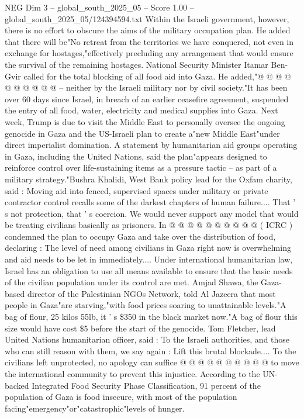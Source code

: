 \begin{textsample}{NEG Dim 3 – global\_south\_2025\_05 – Score 1.00 – global\_south\_2025\_05/124394594.txt}
Within the Israeli government, however, there is no effort to obscure the aims of the military occupation plan.
He added that there will be"No retreat from the territories we have conquered, not even in exchange for hostages,"effectively precluding any arrangement that would ensure the survival of the remaining hostages.
National Security Minister Itamar Ben-Gvir called for the total blocking of all food aid into Gaza.
He added,"@ @ @ @ @ @ @ @ @ @ -- neither by the Israeli military nor by civil society."It has been over 60 days since Israel, in breach of an earlier ceasefire agreement, suspended the entry of all food, water, electricity and medical supplies into Gaza.
Next week, Trump is due to visit the Middle East to personally oversee the ongoing genocide in Gaza and the US-Israeli plan to create a"new Middle East"under direct imperialist domination.
A statement by humanitarian aid groups operating in Gaza, including the United Nations, said the plan"appears designed to reinforce control over life-sustaining items as a pressure tactic -- as part of a military strategy."Bushra Khalidi, West Bank policy lead for the Oxfam charity, said : Moving aid into fenced, supervised spaces under military or private contractor control recalls some of the darkest chapters of human failure....
That ' s not protection, that ' s coercion.
We would never support any model that would be treating civilians basically as prisoners.
In @ @ @ @ @ @ @ @ @ @ ( ICRC ) condemned the plan to occupy Gaza and take over the distribution of food, declaring : The level of need among civilians in Gaza right now is overwhelming and aid needs to be let in immediately....
Under international humanitarian law, Israel has an obligation to use all means available to ensure that the basic needs of the civilian population under its control are met.
Amjad Shawa, the Gaza-based director of the Palestinian NGOs Network, told Al Jazeera that most people in Gaza"are starving,"with food prices soaring to unattainable levels."A bag of flour, 25 kilos 55lb, it ' s \$350 in the black market now."A bag of flour this size would have cost \$5 before the start of the genocide.
Tom Fletcher, lead United Nations humanitarian officer, said : To the Israeli authorities, and those who can still reason with them, we say again : Lift this brutal blockade....
To the civilians left unprotected, no apology can suffice @ @ @ @ @ @ @ @ @ @ to move the international community to prevent this injustice.
According to the UN-backed Integrated Food Security Phase Classification, 91 percent of the population of Gaza is food insecure, with most of the population facing"emergency"or"catastrophic"levels of hunger.

\end{textsample}

